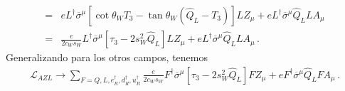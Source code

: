 \begin{frame}
\begin{align}
=&e L^{\dagger}\overline{\sigma}^\mu\left[\cot\theta_W T_3-\tan\theta_W\left(\widehat{Q}_L-T_3\right)\right]L Z_\mu
       +e L^{\dagger}\overline{\sigma}^\mu \widehat{Q}_L L A_\mu\nonumber\\
=&\frac{e}{2c_W s_W} L^{\dagger}\overline{\sigma}^\mu\left[ \tau_3-2s_W^2\widehat{Q}_L\right]L Z_\mu
       +e L^{\dagger}\overline{\sigma}^\mu \widehat{Q}_L L A_\mu\,.
\end{align}
Generalizando para los otros campos, tenemos
\begin{align}
  \label{eq:azl}
      \mathcal{L}_{A Z L}\to\sum_{F=Q,L,e_R^{\dagger},d_R^{\dagger},u_R^{\dagger}}\frac{e}{2c_W s_W}{F}^{\dagger}\overline{\sigma}^\mu\left[ \tau_3-2s_W^2\widehat{Q}_L\right]F Z_\mu
       +e{F}^{\dagger}\overline{\sigma}^\mu \widehat{Q}_L F A_\mu\,.
\end{align}


\end{frame}
